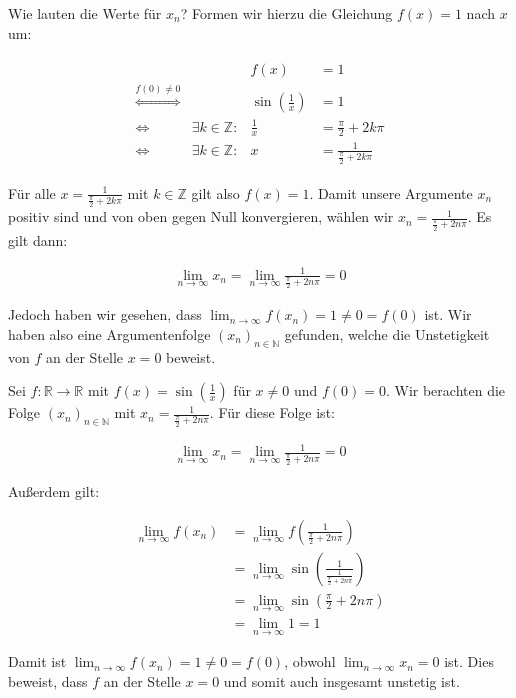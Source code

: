 \documentclass[fontsize=9pt,
               parskip=half-,
               DIV=14,
               listof=chapterentry,
               tocflat]{scrbook}
\begin{document}
\begin{solutionprocess*}
Wie lauten die Werte für $x_{n}$? Formen wir hierzu die Gleichung $f(x)=1$ nach $x$ um:

\begin{align*}
{\begin{array}{rrrl}&&f(x)&=1\\[0.5em]{\overset {f(0)\neq 0}{\iff {}}}&&\sin \left({\frac {1}{x}}\right)&=1\\[0.5em]\iff {}&\exists k\in \mathbb {Z} :&{\frac {1}{x}}&={\frac {\pi }{2}}+2k\pi \\[0.5em]\iff {}&\exists k\in \mathbb {Z} :&x&={\frac {1}{{\frac {\pi }{2}}+2k\pi }}\end{array}}
\end{align*}

Für alle $x={\tfrac {1}{{\frac {\pi }{2}}+2k\pi }}$ mit $k\in \mathbb {Z} $ gilt also $f(x)=1$. Damit unsere Argumente $x_{n}$ positiv sind und von oben gegen Null konvergieren, wählen wir $x_{n}={\tfrac {1}{{\frac {\pi }{2}}+2n\pi }}$. Es gilt dann:

\begin{align*}
\lim _{n\to \infty }x_{n}=\lim _{n\to \infty }{\frac {1}{{\frac {\pi }{2}}+2n\pi }}=0
\end{align*}

Jedoch haben wir gesehen, dass $\lim _{n\to \infty }f(x_{n})=1\neq 0=f(0)$ ist. Wir haben also eine Argumentenfolge $(x_{n})_{n\in \mathbb {N} }$ gefunden, welche die Unstetigkeit von $f$ an der Stelle $x=0$ beweist.

\end{solutionprocess*}

\begin{proof*}
Sei $f:\mathbb {R} \to \mathbb {R} $ mit $f(x)=\sin \left({\tfrac {1}{x}}\right)$ für $x\neq 0$ und $f(0)=0$. Wir berachten die Folge $(x_{n})_{n\in \mathbb {N} }$ mit $x_{n}={\tfrac {1}{{\frac {\pi }{2}}+2n\pi }}$. Für diese Folge ist:

\begin{align*}
\lim _{n\to \infty }x_{n}=\lim _{n\to \infty }{\frac {1}{{\frac {\pi }{2}}+2n\pi }}=0
\end{align*}

Außerdem gilt:

\begin{align*}
\lim _{n\to \infty }f(x_{n})&=\lim _{n\to \infty }f\left({\frac {1}{{\frac {\pi }{2}}+2n\pi }}\right)\\[0.5em]&=\lim _{n\to \infty }\sin \left({\frac {1}{\frac {1}{{\frac {\pi }{2}}+2n\pi }}}\right)\\[0.5em]&=\lim _{n\to \infty }\sin \left({\frac {\pi }{2}}+2n\pi \right)\\[0.5em]&=\lim _{n\to \infty }1=1
\end{align*}

Damit ist $\lim _{n\to \infty }f(x_{n})=1\neq 0=f(0)$, obwohl $\lim _{n\to \infty }x_{n}=0$ ist. Dies beweist, dass $f$ an der Stelle $x=0$ und somit auch insgesamt unstetig ist.

\end{proof*}
\end{document}
